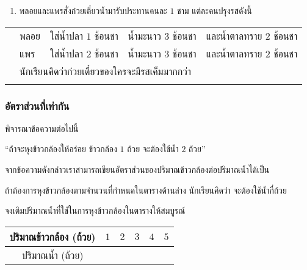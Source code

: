 \documentclass[
  a4paper,
  DIV=11,
  numbers=noendperiod]{scrartcl}
\providecommand{\tightlist}{%
  \setlength{\itemsep}{0pt}\setlength{\parskip}{0pt}}
\begin{document}
\begin{enumerate}
\def\labelenumi{\arabic{enumi}.}
\setcounter{enumi}{3}
\tightlist
\item
  พลอยและแพรสั่งก๋วยเตี๋ยวน้ำมารับประทานคนละ \(1\) ชาม แต่ละคนปรุงรสดังนี้
\end{enumerate}

\begin{tabular}{p{0.5cm}llll}

& พลอย  & ใส่น้ำปลา $1$ ช้อนชา & น้ำมะนาว $3$ ช้อนชา & และน้ำตาลทราย $2$ ช้อนชา \\

& แพร  & ใส่น้ำปลา $2$ ช้อนชา & น้ำมะนาว $3$ ช้อนชา & และน้ำตาลทราย $2$ ช้อนชา \\

& \multicolumn{4}{l}{นักเรียนคิดว่าก๋วยเตี๋ยวของใครจะมีรสเค็มมากกว่า}\\

& \multicolumn{4}{p{10cm}}{\dotfill}\\



\end{tabular}

\newpage

\subsubsection{อัตราส่วนที่เท่ากัน}\label{uxe2duxe15uxe23uxe32uxe2auxe27uxe19uxe17uxe40uxe17uxe32uxe01uxe19}

พิจารณาข้อความต่อไปนี้

\centering

``ถ้าจะหุงข้าวกล้องให้อร่อย ข้าวกล้อง \(1\) ถ้วย จะต้องใช้น้ำ \(2\) ถ้วย''

\vspace{-10pt}

\flushleft

จากข้อความดังกล่าวเราสามารถเขียนอัตราส่วนของปริมาณข้าวกล้องต่อปริมาณน้ำได้เป็น
\dotfill

ถ้าต้องการหุงข้าวกล้องตามจำนวนที่กำหนดในตารางด้านล่าง นักเรียนคิดว่า จะต้องใช้น้ำกี่ถ้วย

จงเติมปริมาณน้ำที่ใช้ในการหุงข้าวกล้องในตารางให้สมบูรณ์

\centering

\begin{tabular}{c|p{1.5cm}|p{1.5cm}|p{1.5cm}|p{1.5cm}|p{1.5cm}}

\hline

ปริมาณข้าวกล้อง (ถ้วย) & \multicolumn{1}{c|}{$1$} 
                    & \multicolumn{1}{c|}{$2$}
                    & \multicolumn{1}{c|}{$3$}
                    & \multicolumn{1}{c|}{$4$}
                    & \multicolumn{1}{c}{$5$}\\


\hline

ปริมาณน้ำ (ถ้วย) &  
                    & 
                    & 
                    & 
                    & \\

\hline



\end{tabular}
\end{document}
